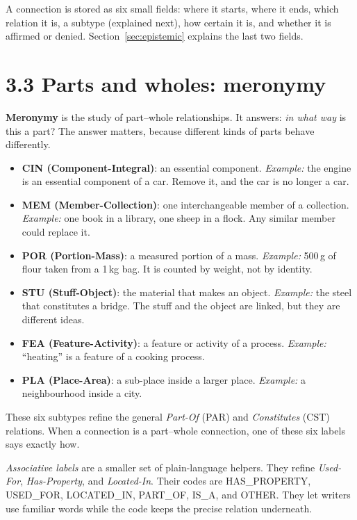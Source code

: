 A connection is stored as six small fields: where it starts, where it ends, which relation it is, a subtype (explained next), how certain it is, and whether it is affirmed or denied. Section~\ref{sec:epistemic} explains the last two fields.

\section*{3.3 Parts and wholes: meronymy}

\textbf{Meronymy} is the study of part--whole relationships. It answers: \textit{in what way} is this a part? The answer matters, because different kinds of parts behave differently.

\begin{itemize}
\item \textbf{CIN (Component-Integral)}: an essential component. \textit{Example:} the engine is an essential component of a car. Remove it, and the car is no longer a car.
\item \textbf{MEM (Member-Collection)}: one interchangeable member of a collection. \textit{Example:} one book in a library, one sheep in a flock. Any similar member could replace it.
\item \textbf{POR (Portion-Mass)}: a measured portion of a mass. \textit{Example:} 500\,g of flour taken from a 1\,kg bag. It is counted by weight, not by identity.
\item \textbf{STU (Stuff-Object)}: the material that makes an object. \textit{Example:} the steel that constitutes a bridge. The stuff and the object are linked, but they are different ideas.
\item \textbf{FEA (Feature-Activity)}: a feature or activity of a process. \textit{Example:} ``heating'' is a feature of a cooking process.
\item \textbf{PLA (Place-Area)}: a sub-place inside a larger place. \textit{Example:} a neighbourhood inside a city.
\end{itemize}

These six subtypes refine the general \textit{Part-Of} (PAR) and \textit{Constitutes} (CST) relations. When a connection is a part--whole connection, one of these six labels says exactly how.

\textit{Associative labels} are a smaller set of plain-language helpers. They refine \textit{Used-For}, \textit{Has-Property}, and \textit{Located-In}. Their codes are HAS\_PROPERTY, USED\_FOR, LOCATED\_IN, PART\_OF, IS\_A, and OTHER. They let writers use familiar words while the code keeps the precise relation underneath.

